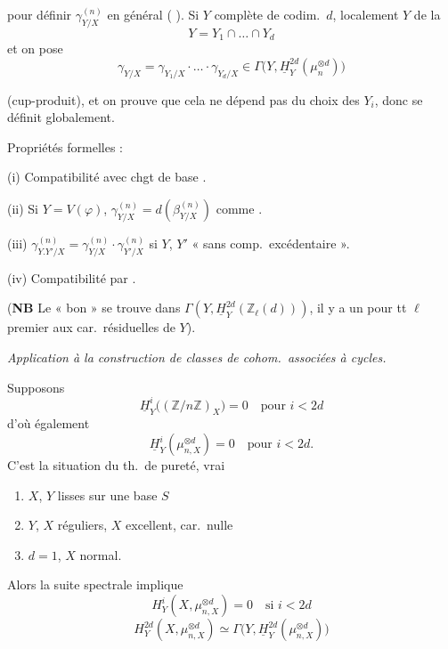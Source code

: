 \documentclass[11pt,a4paper]{article}
\begin{document}
pour \ill{} définir $\gamma^{(n)}_{Y/X}$ en général  ( \ill{}). Si $Y$
 complète de codim.\ $d$, \ill{} localement $Y$ \ill{} \ill{} de la 
\[
  Y = Y_1 \cap \dots \cap Y_d
\]
et on pose
\[
  \gamma_{Y/X} = \gamma_{Y_1/X} \cdot \ldots \cdot \gamma_{Y_d/X}
  \in \Gamma\bigl(Y, \underline{H}^{2d}_Y(\mu_n^{\otimes d})\bigr)
\]

(cup-produit), et on prouve que cela ne dépend pas du choix des $Y_i$, donc se définit globalement.

Propriétés formelles :


(i) Compatibilité avec chgt de base .

(ii) Si $Y = V(\varphi)$, $\gamma^{(n)}_{Y/X} = d(\beta^{(n)}_{Y/X})$ comme .

(iii) $\gamma^{(n)}_{Y.Y'/X} = \gamma^{(n)}_{Y/X} \cdot \gamma^{(n)}_{Y'/X}$ si $Y$, $Y'$ « sans comp.\ excédentaire ».

(iv) Compatibilité par .

(\textbf{NB} Le « bon »  se trouve dans $\Gamma(Y, \underline{H}^{2d}_Y(\mathbb{Z}_\ell(d)))$, il y a un \ill{} pour tt $\ell$
premier aux car.\ résiduelles de $Y$).

\emph{Application à la construction de classes de cohom.\ associées à  cycles.}

Supposons
\[
  \underline{H}^i_Y\bigl((\mathbb{Z}/n\mathbb{Z})_X\bigr) = 0 \quad\text{pour } i < 2d
\]
d'où également
\[
  \underline{H}^i_Y(\mu_{n,X}^{\otimes d}) = 0 \quad\text{pour } i < 2d .
\]
C'est la situation du th.\ de pureté, vrai
\begin{enumerate}
  \item[(i)] $X$, $Y$ lisses sur une base $S$
  \item[(ii)] $Y$, $X$ réguliers, $X$ excellent, car.\ nulle
  \item[(iii)] $d = 1$, $X$ normal.
\end{enumerate}

Alors la suite spectrale implique
\[
  H^i_Y(X, \mu_{n,X}^{\otimes d}) = 0 \quad\text{si } i < 2d
\]
\[
  H^{2d}_Y(X, \mu_{n,X}^{\otimes d}) \simeq \Gamma\bigl(Y, \underline{H}^{2d}_Y(\mu_{n,X}^{\otimes d})\bigr)
\]
\end{document}
